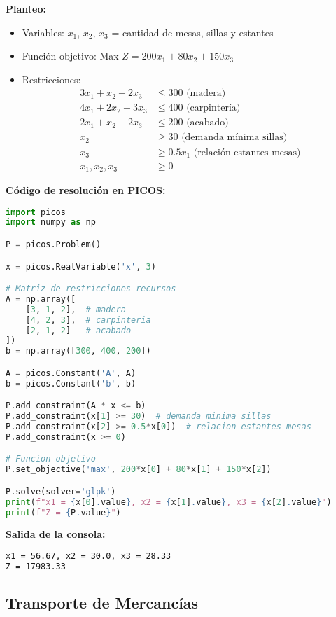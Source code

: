 \documentclass[12pt]{article}
\begin{document}
\textbf{Planteo:}
\begin{itemize}
\item Variables: $x_1$, $x_2$, $x_3$ = cantidad de mesas, sillas y estantes
\item Función objetivo: Max $Z = 200x_1 + 80x_2 + 150x_3$
\item Restricciones:
  \begin{align*}
  3x_1 + x_2 + 2x_3 &\leq 300 \text{ (madera)} \\
  4x_1 + 2x_2 + 3x_3 &\leq 400 \text{ (carpintería)} \\
  2x_1 + x_2 + 2x_3 &\leq 200 \text{ (acabado)} \\
  x_2 &\geq 30 \text{ (demanda mínima sillas)} \\
  x_3 &\geq 0.5x_1 \text{ (relación estantes-mesas)} \\
  x_1, x_2, x_3 &\geq 0
  \end{align*}
\end{itemize}

\textbf{Código de resolución en PICOS:}
\begin{lstlisting}[language=Python]
import picos
import numpy as np

P = picos.Problem()

x = picos.RealVariable('x', 3)

# Matriz de restricciones recursos
A = np.array([
    [3, 1, 2],  # madera
    [4, 2, 3],  # carpinteria
    [2, 1, 2]   # acabado
])
b = np.array([300, 400, 200])

A = picos.Constant('A', A)
b = picos.Constant('b', b)

P.add_constraint(A * x <= b)
P.add_constraint(x[1] >= 30)  # demanda minima sillas
P.add_constraint(x[2] >= 0.5*x[0])  # relacion estantes-mesas
P.add_constraint(x >= 0)

# Funcion objetivo
P.set_objective('max', 200*x[0] + 80*x[1] + 150*x[2])

P.solve(solver='glpk')
print(f"x1 = {x[0].value}, x2 = {x[1].value}, x3 = {x[2].value}")
print(f"Z = {P.value}")
\end{lstlisting}

\textbf{Salida de la consola:}
\begin{lstlisting}[language=bash,backgroundcolor=\color{black},basicstyle=\color{white}\ttfamily,numbers=none]
x1 = 56.67, x2 = 30.0, x3 = 28.33
Z = 17983.33
\end{lstlisting}

\subsection{Transporte de Mercancías}
\end{document}
